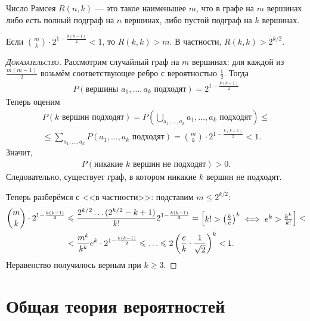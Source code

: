 \begin{exmpl}
 Число Рамсея $R(n,k)$  --- это такое наименьшее $m$, что в графе на $m$ вершинах либо есть полный подграф на $n$ вершинах, либо пустой подграф на $k$ вершинах.
\end{exmpl}
\begin{thm}[Эрдёша]
 Если $\binom m k \cdot 2^{1 - \frac{k(k-1)}{2}} < 1$, то $R(k,k) > m$. В частности, $R(k,k) > 2^{k / 2}$.
\end{thm}
\begin{proof}[\normalfont\textsc{Доказательство}]
 Рассмотрим случайный граф на $m$  вершинах: для каждой из $\frac{m(m-1)}{2}$  возьмём соответствующее ребро с вероятностью $\frac{1}{2}$. Тогда
 \begin{align*}
  P(\text{вершины }a_1, \ldots, a_k\text{ подходят}) = 2^{1-\frac{k(k-1)}{2}}
 \end{align*} Теперь оценим
 \begin{align*}
  P(k \text{ вершин подходят}) = P \left( \bigcup_{a_1, \ldots, a_k} a_1, \ldots, a_k \text{ подходят} \right) \leqslant \\
  \leqslant \sum_{a_1, \ldots, a_k}  P(a_1, \ldots, a_k \text{ подходят}) = \binom m k \cdot 2^{1 - \frac{k(k-1)}{2}} < 1.
 \end{align*} Значит,
 \begin{align*}
  P(\text{никакие $k$ вершин не подходят}) > 0.
 \end{align*} Следовательно, существует граф, в котором никакие  $k$  вершин не подходят.

 Теперь разберёмся с <<в частности>>: подставим $m \leqslant 2^{k / 2}$:
 \begin{align*}
  \binom m k \cdot 2^{1 - \frac{k(k-1)}{2}} &\leqslant \frac{2^{k / 2} \ldots (2^{k / 2} - k + 1)}{k!}2^{1 - \frac{k(k-1)}{2}} = \begin{bmatrix}
  k! > \left( \frac{k}{e} \right)^{k} \iff e^{k} > \frac{k^{k}}{k!} \end{bmatrix} < \\
  &< \frac{m^{k}}{k^{k}}e^{k} \cdot 2^{1-\frac{k(k-1)}{2}} \leqslant {\color{red}\ldots} \leqslant 2 \left( \frac{e}{k} \cdot \frac{1}{\sqrt{2}} \right)^{k} < 1.
 \end{align*} Неравенство получилось верным при $k \geqslant 3$.
\end{proof}

\newpage
\section{Общая теория вероятностей}
